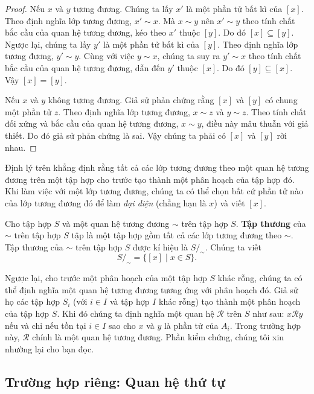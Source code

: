 \begin{proof}
    Nếu $x$ và $y$ tương đương. Chúng ta lấy $x'$ là một phần tử bất kì của $[x]$. Theo định nghĩa lớp tương đương, $x'\sim x$. Mà $x\sim y$ nên $x'\sim y$ theo tính chất bắc cầu của quan hệ tương đương, kéo theo $x'$ thuộc $[y]$. Do đó $[x]\subseteq [y]$. Ngược lại, chúng ta lấy $y'$ là một phần tử bất kì của $[y]$. Theo định nghĩa lớp tương đương, $y'\sim y$. Cùng với việc $y\sim x$, chúng ta suy ra $y'\sim x$ theo tính chất bắc cầu của quan hệ tương đương, dẫn đến $y'$ thuộc $[x]$. Do đó $[y]\subseteq [x]$. Vậy $[x] = [y]$.

    Nếu $x$ và $y$ không tương đương. Giả sử phản chứng rằng $[x]$ và $[y]$ có chung một phần tử $z$. Theo định nghĩa lớp tương đương, $x\sim z$ và $y\sim z$. Theo tính chất đối xứng và bắc cầu của quan hệ tương đương, $x\sim y$, điều này mâu thuẫn với giả thiết. Do đó giả sử phản chứng là sai. Vậy chúng ta phải có $[x]$ và $[y]$ rời nhau.
\end{proof}

Định lý trên khẳng định rằng tất cả các lớp tương đương theo một quan hệ tương đương trên một tập hợp cho trước tạo thành một phân hoạch của tập hợp đó. Khi làm việc với một lớp tương đương, chúng ta có thể chọn bất cứ phần tử nào của lớp tương đương đó để làm \textit{đại diện} (chẳng hạn là $x$) và viết $[x]$.

\begin{definition}
    Cho tập hợp $S$ và một quan hệ tương đương $\sim$ trên tập hợp $S$. \@\textbf{Tập thương} của $\sim$ trên tập hợp $S$ tập là một tập hợp gồm tất cả các lớp tương đương theo $\sim$. Tập thương của $\sim$ trên tập hợp $S$ được kí hiệu là $S/_{\sim}$. Chúng ta viết
    \[
        S/_{\sim} = \{ [x] \mid x\in S \}.
    \]
\end{definition}

Ngược lại, cho trước một phân hoạch của một tập hợp $S$ khác rỗng, chúng ta có thể định nghĩa một quan hệ tương đương tương ứng với phân hoạch đó. Giả sử họ các tập hợp $S_{i}$ (với $i\in I$ và tập hợp $I$ khác rỗng) tạo thành một phân hoạch của tập hợp $S$. Khi đó chúng ta định nghĩa một quan hệ $\mathscr{R}$ trên $S$ như sau: $x\mathscr{R}y$ nếu và chỉ nếu tồn tại $i\in I$ sao cho $x$ và $y$ là phần tử của $A_{i}$. Trong trường hợp này, $\mathscr{R}$ chính là một quan hệ tương đương. Phần kiểm chứng, chúng tôi xin nhường lại cho bạn đọc.

\subsection{Trường hợp riêng: Quan hệ thứ tự}\label{subsection:order-relation}


